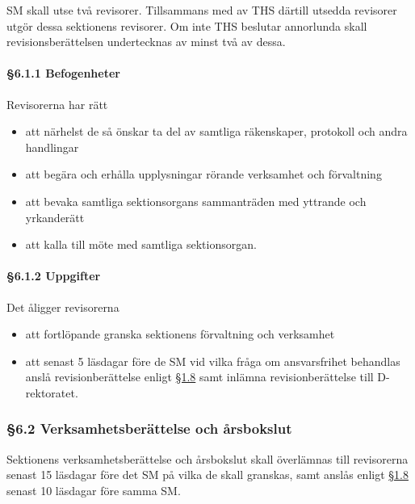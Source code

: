 SM skall utse två revisorer. Tillsammans med av THS därtill utsedda revisorer utgör dessa sektionens revisorer. Om inte THS beslutar annorlunda skall revisionsberättelsen undertecknas av minst två av dessa.

\paragraph{§6.1.1 Befogenheter}

Revisorerna har rätt

\begin{itemize}
  \item att närhelst de så önskar ta del av samtliga räkenskaper, protokoll och andra handlingar
  \item att begära och erhålla upplysningar rörande verksamhet och förvaltning
  \item att bevaka samtliga sektionsorgans sammanträden med yttrande och yrkanderätt
  \item att kalla till möte med samtliga sektionsorgan.
\end{itemize}

\paragraph{§6.1.2 Uppgifter}

Det åligger revisorerna

\begin{itemize}
  \item att fortlöpande granska sektionens förvaltning och verksamhet
  \item att senast 5 läsdagar före de SM vid vilka fråga om ansvarsfrihet behandlas anslå revisionberättelse enligt \href{#officiella_informationskanaler}{§1.8} samt inlämna revisionberättelse till D-rektoratet.
\end{itemize}

\subsubsection{§6.2 Verksamhetsberättelse och årsbokslut}

Sektionens verksamhetsberättelse och årsbokslut skall överlämnas till revisorerna senast 15 läsdagar före det SM på vilka de skall granskas, samt anslås enligt \href{#officiella_informationskanaler}{§1.8} senast 10 läsdagar före samma SM.



